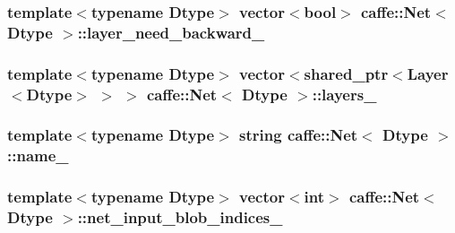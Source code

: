 \hypertarget{classcaffe_1_1_net_a4c4dbb09376c663637e2444a4fd452b0}{
\subsubsection[{layer\+\_\+need\+\_\+backward\+\_\+}]{\setlength{\rightskip}{0pt plus 5cm}template$<$typename Dtype$>$ vector$<$bool$>$ {\bf caffe\+::\+Net}$<$ Dtype $>$\+::layer\+\_\+need\+\_\+backward\+\_\+\hspace{0.3cm}{\ttfamily [protected]}}}\label{classcaffe_1_1_net_a4c4dbb09376c663637e2444a4fd452b0}
\hypertarget{classcaffe_1_1_net_ab9e30392aa01dcf182d1a5cbd34ec45e}{
\subsubsection[{layers\+\_\+}]{\setlength{\rightskip}{0pt plus 5cm}template$<$typename Dtype$>$ vector$<$shared\+\_\+ptr$<${\bf Layer}$<$Dtype$>$ $>$ $>$ {\bf caffe\+::\+Net}$<$ Dtype $>$\+::layers\+\_\+\hspace{0.3cm}{\ttfamily [protected]}}}\label{classcaffe_1_1_net_ab9e30392aa01dcf182d1a5cbd34ec45e}
\hypertarget{classcaffe_1_1_net_aef7021f31e355ab8f8991755125f6b2b}{
\subsubsection[{name\+\_\+}]{\setlength{\rightskip}{0pt plus 5cm}template$<$typename Dtype$>$ string {\bf caffe\+::\+Net}$<$ Dtype $>$\+::name\+\_\+\hspace{0.3cm}{\ttfamily [protected]}}}\label{classcaffe_1_1_net_aef7021f31e355ab8f8991755125f6b2b}
\hypertarget{classcaffe_1_1_net_a083a9a4c3919721c833b53d5571a7400}{
\subsubsection[{net\+\_\+input\+\_\+blob\+\_\+indices\+\_\+}]{\setlength{\rightskip}{0pt plus 5cm}template$<$typename Dtype$>$ vector$<$int$>$ {\bf caffe\+::\+Net}$<$ Dtype $>$\+::net\+\_\+input\+\_\+blob\+\_\+indices\+\_\+\hspace{0.3cm}{\ttfamily [protected]}}}\label{classcaffe_1_1_net_a083a9a4c3919721c833b53d5571a7400}

